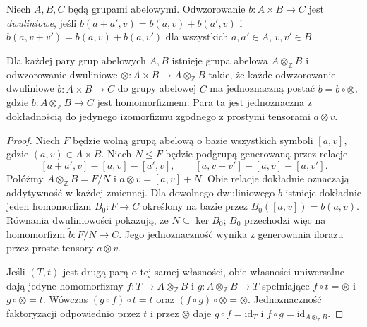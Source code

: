 \begin{definicja}
\label{aa:def:abelian-bilinear}
Niech $A,B,C$ będą grupami abelowymi. Odwzorowanie
$b:A\times B\to C$ jest \emph{dwuliniowe}, jeśli
$b(a+a',v)=b(a,v)+b(a',v)$ i
$b(a,v+v')=b(a,v)+b(a,v')$
dla wszystkich $a,a'\in A$, $v,v'\in B$.
\end{definicja}

\begin{twierdzenie}
\label{aa:tw:abelian-tensor-universal}
Dla każdej pary grup abelowych $A,B$ istnieje grupa abelowa
$A\otimes_{\mathbb Z}B$ i odwzorowanie dwuliniowe
$\otimes:A\times B\to A\otimes_{\mathbb Z}B$ takie, że
każde odwzorowanie dwuliniowe $b:A\times B\to C$ do grupy
abelowej $C$ ma jednoznaczną postać
$b=\widetilde b\circ\otimes$, gdzie
$\widetilde b:A\otimes_{\mathbb Z}B\to C$ jest homomorfizmem.
Para ta jest jednoznaczna z dokładnością do jedynego
izomorfizmu zgodnego z prostymi tensorami $a\otimes v$.
\end{twierdzenie}
\begin{proof}
Niech $F$ będzie wolną grupą abelową o bazie wszystkich
symboli $[a,v]$, gdzie $(a,v)\in A\times B$.
Niech $N\le F$ będzie podgrupą generowaną przez relacje
\[
[a+a',v]-[a,v]-[a',v],\qquad
[a,v+v']-[a,v]-[a,v'].
\]
Połóżmy $A\otimes_{\mathbb Z}B=F/N$ i
$a\otimes v=[a,v]+N$. Obie relacje dokładnie oznaczają
addytywność w każdej zmiennej. Dla dowolnego dwuliniowego
$b$ istnieje dokładnie jeden homomorfizm $B_0:F\to C$
określony na bazie przez $B_0([a,v])=b(a,v)$.
Równania dwuliniowości pokazują, że $N\subseteq\ker B_0$;
$B_0$ przechodzi więc na homomorfizm $\widetilde b:F/N\to C$.
Jego jednoznaczność wynika z generowania ilorazu przez
proste tensory $a\otimes v$.

Jeśli $(T,t)$ jest drugą parą o tej samej własności,
obie własności uniwersalne dają jedyne homomorfizmy
$f:T\to A\otimes_{\mathbb Z}B$ i $g:A\otimes_{\mathbb Z}B\to T$
spełniające $f\circ t=\otimes$ i $g\circ\otimes=t$.
Wówczas $(g\circ f)\circ t=t$ oraz
$(f\circ g)\circ\otimes=\otimes$.
Jednoznaczność faktoryzacji odpowiednio przez $t$ i przez
$\otimes$ daje $g\circ f=\mathrm{id}_T$ i
$f\circ g=\mathrm{id}_{A\otimes_{\mathbb Z}B}$.
\end{proof}

